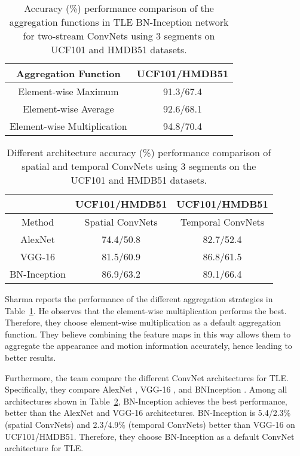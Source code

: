 \documentclass[10pt,twocolumn,letterpaper]{article}
\begin{document}
\begin{table}[tp]
\caption{Accuracy (\%) performance comparison of the aggregation functions in TLE BN-Inception network for two-stream ConvNets using 3 segments on UCF101 and HMDB51 datasets.} \label{t1}
\begin{center}
	\begin{tabular}{|c|c|}
		\hline
		Aggregation Function & UCF101/HMDB51\\
		\hline
		Element-wise Maximum & 91.3/67.4 \\
		Element-wise Average & 92.6/68.1  \\
		Element-wise Multiplication  & 94.8/70.4 \\
		\hline
	\end{tabular}
\end{center}
\end{table}

\begin{table}
	\caption{Different architecture accuracy (\%) performance comparison of spatial and temporal ConvNets using 3 segments on the UCF101 and HMDB51 datasets.}\label{t2}
	\begin{center}
		\begin{tabular}{|c|c|c|}
			\hline
			& UCF101/HMDB51 & UCF101/HMDB51 \\
			\hline
			Method & Spatial ConvNets  & Temporal ConvNets \\
			AlexNet & 74.4/50.8  & 82.7/52.4 \\
			VGG-16   & 81.5/60.9  & 86.8/61.5 \\
			BN-Inception & 86.9/63.2  & 89.1/66.4 \\
			\hline
		\end{tabular}
	\end{center}
\end{table}

Sharma reports the performance of the different aggregation strategies in Table~\ref{t1}. He observes that the element-wise multiplication performs the best. Therefore, they choose element-wise multiplication as a default aggregation function. They believe combining the feature maps in this way allows them to aggregate the appearance and motion information accurately, hence leading to better results. 

Furthermore, the team compare the different ConvNet architectures for TLE. Specifically, they compare AlexNet \cite{krizhevsky2012imagenet}, VGG-16 \cite{simonyan2014very}, and BNInception \cite{ioffe2015batch}. Among all architectures shown in Table~\ref{t2}, BN-Inception achieves the best performance, better than the AlexNet and VGG-16 architectures. BN-Inception is 5.4/2.3\% (spatial ConvNets) and 2.3/4.9\% (temporal ConvNets) better than VGG-16 on UCF101/HMDB51. Therefore, they choose BN-Inception as a default ConvNet architecture for TLE.

{\small


}
\end{document}
